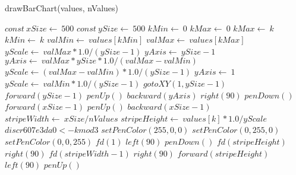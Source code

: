 \documentclass[a4paper,10pt]{article}
\begin{document}
\begin{algorithm}
\caption{drawBarChart(values, nValues)}
\begin{algorithmic}[5]

\STATE {}
\STATE {}
\STATE {}
\STATE {}
  \STATE \(const\ xSize\gets\ 500\)
  \STATE \(const\ ySize\gets\ 500\)
  \STATE \(kMin\gets\ 0\)
  \STATE \(kMax\gets\ 0\)
      \STATE \(kMax\gets\ k\)
    \ELSE
        \STATE \(kMin\gets\ k\)
      \ENDIF
    \ENDIF
  \ENDFOR
  \STATE \(valMin\gets\ values[kMin]\)
  \STATE \(valMax\gets\ values[kMax]\)
  \STATE \(yScale\gets\ valMax*1.0/(ySize-1)\)
  \STATE \(yAxis\gets\ ySize-1\)
      \STATE \(yAxis\gets\ valMax*ySize*1.0/(valMax-valMin)\)
      \STATE \(yScale\gets(valMax-valMin)*1.0/(ySize-1)\)
    \ELSE
      \STATE \(yAxis\gets\ 1\)
      \STATE \(yScale\gets\ valMin*1.0/(ySize-1)\)
    \ENDIF
  \ENDIF
  \STATE \(gotoXY(1,ySize-1)\)
  \STATE \(forward(ySize-1)\)
  \STATE \(penUp()\)
  \STATE \(backward(yAxis)\)
  \STATE \(right(90)\)
  \STATE \(penDown()\)
  \STATE \(forward(xSize-1)\)
  \STATE \(penUp()\)
  \STATE \(backward(xSize-1)\)
  \STATE \(stripeWidth\gets\ xSize/nValues\)
    \STATE \(stripeHeight\gets\ values[k]*1.0/yScale\)
    \STATE \(discr607e3da0 <- k mod 3\)
      \STATE \(setPenColor(255,0,0)\)
      \STATE \(setPenColor(0,255,0)\)
      \STATE \(setPenColor(0,0,255)\)
    \ENDIF
    \STATE \(fd(1)\)
    \STATE \(left(90)\)
    \STATE \(penDown()\)
    \STATE \(fd(stripeHeight)\)
    \STATE \(right(90)\)
    \STATE \(fd(stripeWidth-1)\)
    \STATE \(right(90)\)
    \STATE \(forward(stripeHeight)\)
    \STATE \(left(90)\)
    \STATE \(penUp()\)
  \ENDFOR

\end{algorithmic}
\end{algorithm}
\end{document}
